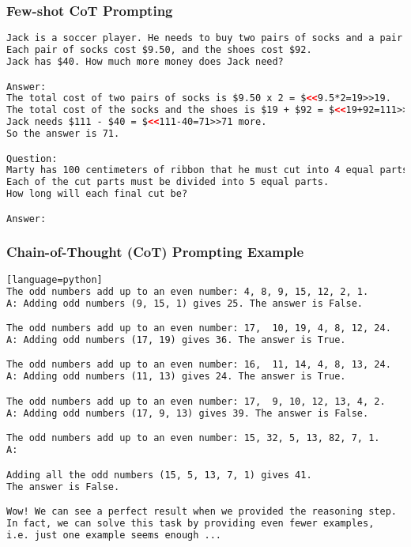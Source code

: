 \begin{frame}[fragile]\frametitle{Few-shot CoT Prompting}

\begin{lstlisting}[language=HTML]
Jack is a soccer player. He needs to buy two pairs of socks and a pair of soccer shoes.
Each pair of socks cost $9.50, and the shoes cost $92.
Jack has $40. How much more money does Jack need?

Answer:
The total cost of two pairs of socks is $9.50 x 2 = $<<9.5*2=19>>19.
The total cost of the socks and the shoes is $19 + $92 = $<<19+92=111>>111.
Jack needs $111 - $40 = $<<111-40=71>>71 more.
So the answer is 71.

Question:
Marty has 100 centimeters of ribbon that he must cut into 4 equal parts.
Each of the cut parts must be divided into 5 equal parts.
How long will each final cut be?

Answer:
\end{lstlisting} %


\end{frame}





\begin{frame}[fragile]\frametitle{Chain-of-Thought (CoT) Prompting Example}


\begin{lstlisting}[language=HTML][language=python]
The odd numbers add up to an even number: 4, 8, 9, 15, 12, 2, 1.
A: Adding odd numbers (9, 15, 1) gives 25. The answer is False.

The odd numbers add up to an even number: 17,  10, 19, 4, 8, 12, 24.
A: Adding odd numbers (17, 19) gives 36. The answer is True.

The odd numbers add up to an even number: 16,  11, 14, 4, 8, 13, 24.
A: Adding odd numbers (11, 13) gives 24. The answer is True.

The odd numbers add up to an even number: 17,  9, 10, 12, 13, 4, 2.
A: Adding odd numbers (17, 9, 13) gives 39. The answer is False.

The odd numbers add up to an even number: 15, 32, 5, 13, 82, 7, 1.
A:

Adding all the odd numbers (15, 5, 13, 7, 1) gives 41. 
The answer is False.

Wow! We can see a perfect result when we provided the reasoning step. 
In fact, we can solve this task by providing even fewer examples, 
i.e. just one example seems enough ...
\end{lstlisting}

\end{frame}


